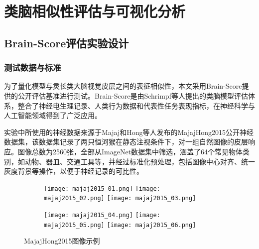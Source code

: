 
\chapter{类脑相似性评估与可视化分析}

\section{Brain-Score评估实验设计}

\subsection{测试数据与标准}

为了量化模型与灵长类大脑视觉皮层之间的表征相似性，本文采用Brain-Score提供的公开评估基准进行测试。Brain-Score是由Schrimpf等人提出的类脑模型评估体系，整合了神经电生理记录、人类行为数据和代表性任务表现指标，在神经科学与人工智能领域得到了广泛应用\cite{schrimpf2018brain}。

实验中所使用的神经数据来源于Majaj和Hong等人发布的MajajHong2015公开神经数据集，该数据集记录了两只恒河猴在静态注视条件下，对一组自然图像的皮层响应。图像总数为2560张，全部从ImageNet数据集中筛选，涵盖了64个常见物体类别，如动物、器皿、交通工具等，并经过标准化预处理，包括图像中心对齐、统一灰度背景等操作，以便于神经记录的可比性\cite{majaj2015simple}。

\begin{figure}[!htb]
	\centering
	\begin{subfigure}[t]{0.9\linewidth}
		\centering
		\texttt{[image: majaj2015\_01.png]}
		\hspace{0.05cm}
		\texttt{[image: majaj2015\_02.png]}
		\hspace{0.05cm}
		\texttt{[image: majaj2015\_03.png]}
	\end{subfigure}	
	
	\vspace{0.05cm}
	
	\begin{subfigure}[t]{0.9\linewidth}
		\centering
		\texttt{[image: majaj2015\_04.png]}
		\hspace{0.05cm}
		\texttt{[image: majaj2015\_05.png]}
		\hspace{0.05cm}
		\texttt{[image: majaj2015\_06.png]}
	\end{subfigure}
	\caption{MajajHong2015图像示例}
	\label{f.majaj_samples}
\end{figure}

